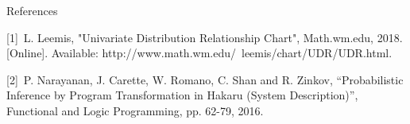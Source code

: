 \documentclass[22pt]{beamer}
\begin{document}
\begin{frame}[fragile]
\begin{textblock}{5}
\begin{block}{\Large{References}}

\scriptsize{[1]~L. Leemis, "Univariate Distribution Relationship Chart", Math.wm.edu, 2018. [Online]. Available: http://www.math.wm.edu/~leemis/chart/UDR/UDR.html. 

[2]~P. Narayanan, J. Carette, W. Romano, C. Shan and R. Zinkov, “Probabilistic Inference by Program Transformation in Hakaru (System Description)”, Functional and Logic Programming, pp. 62-79, 2016.}


\end{block}


% 

\end{textblock}
\end{frame}
\end{document}
